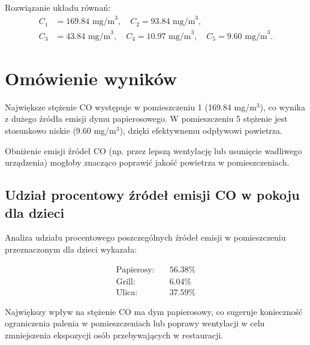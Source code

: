 \documentclass{article}
\begin{document}
Rozwiązanie układu równań:
\begin{align*}
    C_1 &= 169.84 \text{ mg/m}^3, \quad C_2 = 93.84 \text{ mg/m}^3, \\
    C_3 &= 43.84 \text{ mg/m}^3, \quad C_4 = 10.97 \text{ mg/m}^3, \quad C_5 = 9.60 \text{ mg/m}^3.
\end{align*}

\section{Omówienie wyników}
Największe stężenie CO występuje w pomieszczeniu 1 (169.84 mg/m$^3$), co wynika z dużego źródła emisji dymu papierosowego. W pomieszczeniu 5 stężenie jest stosunkowo niskie (9.60 mg/m$^3$), dzięki efektywnemu odpływowi powietrza.

Obniżenie emisji źródeł CO (np. przez lepszą wentylację lub usunięcie wadliwego urządzenia) mogłoby znacząco poprawić jakość powietrza w pomieszczeniach.

\subsection{Udział procentowy źródeł emisji CO w pokoju dla dzieci}
Analiza udziału procentowego poszczególnych źródeł emisji w pomieszczeniu przeznaczonym dla dzieci wykazała:

\[
\begin{aligned}
    \text{Papierosy:} & \quad 56.38\% \\
    \text{Grill:} & \quad 6.04\% \\
    \text{Ulica:} & \quad 37.59\%
\end{aligned}
\]

Największy wpływ na stężenie CO ma dym papierosowy, co sugeruje konieczność ograniczenia palenia w pomieszczeniach lub poprawy wentylacji w celu zmniejszenia ekspozycji osób przebywających w restauracji.
\end{document}
